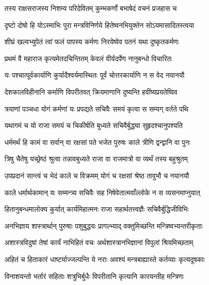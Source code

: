 
\twolineshloka
{तस्य राक्षसराजस्य निशम्य परिदेवितम्}
{कुम्भकर्णो बभाषेदं वचनं प्रजहास च} %

\twolineshloka
{दृष्टो दोषो हि योऽस्माभिः पुरा मन्त्रविनिर्णये}
{हितेष्वनभियुक्तेन सोऽयमासादितस्त्वया} %

\twolineshloka
{शीघ्रं खल्वभ्युपेतं त्वां फलं पापस्य कर्मणः}
{निरयेष्वेव पतनं यथा दुष्कृतकर्मणः} %

\twolineshloka
{प्रथमं वै महाराज कृत्यमेतदचिन्तितम्}
{केवलं वीर्यदर्पेण नानुबन्धो विचारितः} %

\twolineshloka
{यः पश्चात्पूर्वकार्याणि कुर्यादैश्वर्यमास्थितः}
{पूर्वं चोत्तरकार्याणि न स वेद नयानयौ} %

\twolineshloka
{देशकालविहीनानि कर्माणि विपरीतवत्}
{क्रियमाणानि दुष्यन्ति हवींष्यप्रयतेष्विव} %

\twolineshloka
{त्रयाणां पञ्चधा योगं कर्मणां यः प्रपद्यते}
{सचिवैः समयं कृत्वा स सम्यग् वर्तते पथि} %

\twolineshloka
{यथागमं च यो राजा समयं च चिकीर्षति}
{बुध्यते सचिवैर्बुद्ध्या सुहृदश्चानुपश्यति} %

\twolineshloka
{धर्ममर्थं हि कामं वा सर्वान् वा रक्षसां पते}
{भजेत पुरुषः काले त्रीणि द्वन्द्वानि वा पुनः} %

\twolineshloka
{त्रिषु चैतेषु यच्छ्रेष्ठं श्रुत्वा तन्नावबुध्यते}
{राजा वा राजमात्रो वा व्यर्थं तस्य बहुश्रुतम्} %

\twolineshloka
{उपप्रदानं सान्त्वं च भेदं काले च विक्रमम्}
{योगं च रक्षसां श्रेष्ठ तावुभौ च नयानयौ} %

\twolineshloka
{काले धर्मार्थकामान् यः सम्मन्त्र्य सचिवैः सह}
{निषेवेतात्मवाँल्लोके न स व्यसनमाप्नुयात्} %

\twolineshloka
{हितानुबन्धमालोक्य कुर्यात् कार्यमिहात्मनः}
{राजा सहार्थतत्त्वज्ञैः सचिवैर्बुद्धिजीविभिः} %

\twolineshloka
{अनभिज्ञाय शास्त्रार्थान् पुरुषाः पशुबुद्धयः}
{प्रागल्भ्याद् वक्तुमिच्छन्ति मन्त्रिष्वभ्यन्तरीकृताः} %

\twolineshloka
{अशास्त्रविदुषां तेषां कार्यं नाभिहितं वचः}
{अर्थशास्त्रानभिज्ञानां विपुलां श्रियमिच्छताम्} %

\twolineshloka
{अहितं च हिताकारं धार्ष्ट्याज्जल्पन्ति ये नराः}
{अवश्यं मन्त्रबाह्यास्ते कर्तव्याः कृत्यदूषकाः} %

\twolineshloka
{विनाशयन्तो भर्तारं सहिताः शत्रुभिर्बुधैः}
{विपरीतानि कृत्यानि कारयन्तीह मन्त्रिणः} %

